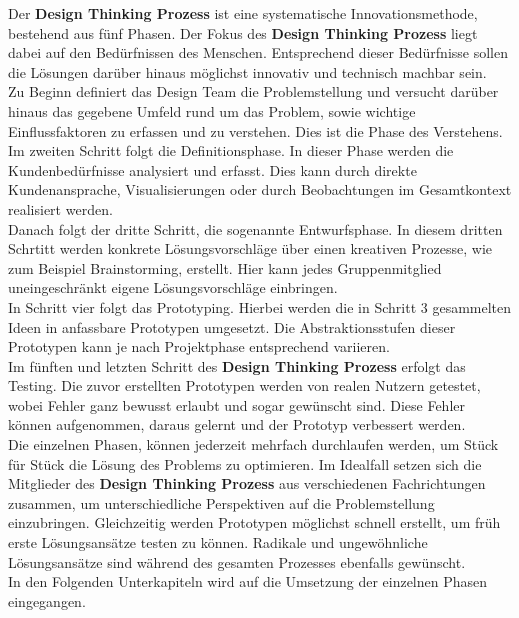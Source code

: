 Der \textbf{Design Thinking Prozess} ist eine systematische Innovationsmethode, bestehend aus fünf Phasen. Der Fokus des \textbf{Design Thinking Prozess} liegt dabei auf den Bedürfnissen des Menschen. Entsprechend dieser Bedürfnisse sollen die Lösungen darüber hinaus möglichst innovativ und technisch machbar sein.\\
Zu Beginn definiert das Design Team die Problemstellung und versucht darüber hinaus das gegebene Umfeld rund um das Problem, sowie wichtige Einflussfaktoren zu erfassen und zu verstehen. Dies ist die Phase des Verstehens.\\
Im zweiten Schritt folgt die Definitionsphase. In dieser Phase werden die Kundenbedürfnisse analysiert und erfasst. Dies kann durch direkte Kundenansprache, Visualisierungen oder durch Beobachtungen im Gesamtkontext realisiert werden.\\
Danach folgt der dritte Schritt, die sogenannte Entwurfsphase. In diesem dritten Schrtitt werden konkrete Lösungsvorschläge über einen kreativen Prozesse, wie zum Beispiel Brainstorming, erstellt. Hier kann jedes Gruppenmitglied uneingeschränkt eigene Lösungsvorschläge einbringen.\\
In Schritt vier folgt das Prototyping. Hierbei werden die in Schritt 3 gesammelten Ideen in anfassbare Prototypen umgesetzt. Die Abstraktionsstufen dieser Prototypen kann je nach Projektphase entsprechend variieren.\\
Im fünften und letzten Schritt des \textbf{Design Thinking Prozess} erfolgt das Testing. Die zuvor erstellten Prototypen werden von realen Nutzern getestet, wobei Fehler ganz bewusst erlaubt und sogar gewünscht sind. Diese Fehler können aufgenommen, daraus gelernt und der Prototyp verbessert werden.\\
Die einzelnen Phasen, können jederzeit mehrfach durchlaufen werden, um Stück für Stück die Lösung des Problems zu optimieren. Im Idealfall setzen sich die Mitglieder des \textbf{Design Thinking Prozess} aus verschiedenen Fachrichtungen zusammen, um unterschiedliche Perspektiven auf die Problemstellung einzubringen. Gleichzeitig werden Prototypen möglichst schnell erstellt, um früh erste Lösungsansätze testen zu können. Radikale und ungewöhnliche Lösungsansätze sind während des gesamten Prozesses ebenfalls gewünscht.\\
In den Folgenden Unterkapiteln wird auf die Umsetzung der einzelnen Phasen eingegangen.